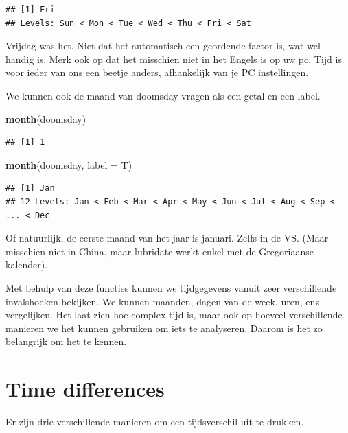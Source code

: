 \documentclass[]{tufte-book}
\newenvironment{Shaded}{}{}
\newcommand{\DataTypeTok}[1]{\textcolor[rgb]{0.56,0.13,0.00}{#1}}
\newcommand{\KeywordTok}[1]{\textcolor[rgb]{0.00,0.44,0.13}{\textbf{#1}}}
\newcommand{\NormalTok}[1]{#1}
\begin{document}
\begin{verbatim}
## [1] Fri
## Levels: Sun < Mon < Tue < Wed < Thu < Fri < Sat
\end{verbatim}

Vrijdag was het. Niet dat het automatisch een geordende factor is, wat wel handig is. Merk ook op dat het misschien niet in het Engels is op uw pc. Tijd is voor ieder van ons een beetje anders, afhankelijk van je PC instellingen.

We kunnen ook de maand van doomsday vragen als een getal en een label.

\begin{Shaded}
\begin{Highlighting}[]
\KeywordTok{month}\NormalTok{(doomsday)}
\end{Highlighting}
\end{Shaded}

\begin{verbatim}
## [1] 1
\end{verbatim}

\begin{Shaded}
\begin{Highlighting}[]
\KeywordTok{month}\NormalTok{(doomsday, }\DataTypeTok{label =}\NormalTok{ T)}
\end{Highlighting}
\end{Shaded}

\begin{verbatim}
## [1] Jan
## 12 Levels: Jan < Feb < Mar < Apr < May < Jun < Jul < Aug < Sep < ... < Dec
\end{verbatim}

Of natuurlijk, de eerste maand van het jaar is januari. Zelfs in de VS. (Maar misschien niet in China, maar lubridate werkt enkel met de Gregoriaanse kalender).

Met behulp van deze functies kunnen we tijdgegevens vanuit zeer verschillende invalshoeken bekijken. We kunnen maanden, dagen van de week, uren, enz. vergelijken. Het laat zien hoe complex tijd is, maar ook op hoeveel verschillende manieren we het kunnen gebruiken om iets te analyseren. Daarom is het zo belangrijk om het te kennen.

\hypertarget{time-differences}{%
\section{Time differences}\label{time-differences}}

Er zijn drie verschillende manieren om een tijdsverschil uit te drukken.
\end{document}
